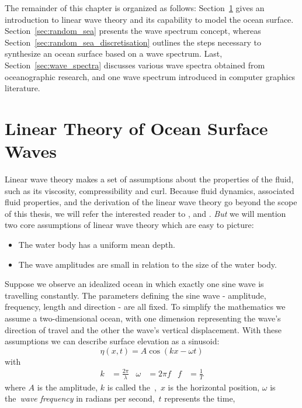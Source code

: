 The remainder of this chapter is organized as follows:
Section~\ref{sec:linear_theory_ocean_waves} gives an introduction to linear wave theory
and its capability to model the ocean surface. Section~\ref{sec:random_sea}
presents the wave spectrum concept, whereas Section~\ref{sec:random_sea_discretisation}
outlines the steps necessary to synthesize an ocean surface based on
a wave spectrum. Last, Section~\ref{sec:wave_spectra} discusses various
wave spectra obtained from oceanographic research, and one wave spectrum
introduced in computer graphics literature.

\section{Linear Theory of Ocean Surface Waves}
\label{sec:linear_theory_ocean_waves}
Linear wave theory makes a set of assumptions about the properties of the fluid, such as its viscosity,
compressibility and curl. Because fluid dynamics, associated fluid properties, and the derivation
of the linear wave theory go beyond the scope of this thesis, we will refer the interested reader
to \citet{book:airy1845tides}, \citet{book:batchelor2000introduction}
and \citet{book:kinsman2002wind}.
\emph{But} we will mention two core assumptions of linear wave theory which are easy to picture:
\begin{itemize}
 \item The water body has a uniform mean depth.
 \item The wave amplitudes are small in relation to the size of the water body.
\end{itemize}
Suppose we observe an idealized ocean in which exactly one sine wave is travelling constantly.
The parameters defining the sine wave - amplitude, frequency, length and direction - are all fixed.
To simplify the mathematics we assume a two-dimensional ocean, with one
dimension representing the wave's direction of travel and the  other the wave's
vertical displacement. With these assumptions we can describe surface elevation
as a sinusoid:
%
\begin{equation}
\label{eq:sinusoid}
 \eta(x, t) = A\cos(kx - \omega t)
\end{equation}
with
\begin{align*}
\label{eq:sinusoid_parameters}
 k &= \frac{2\pi}{\lambda} & \omega &= 2\pi f & f &= \frac{1}{T}
\end{align*}
%
where $A$ is the amplitude, $k$ is called the~\emph{\wavenumber},~$x$ is the horizontal position,
$\omega$ is the~\emph{wave frequency} in radians per second,~$t$ represents the time,
